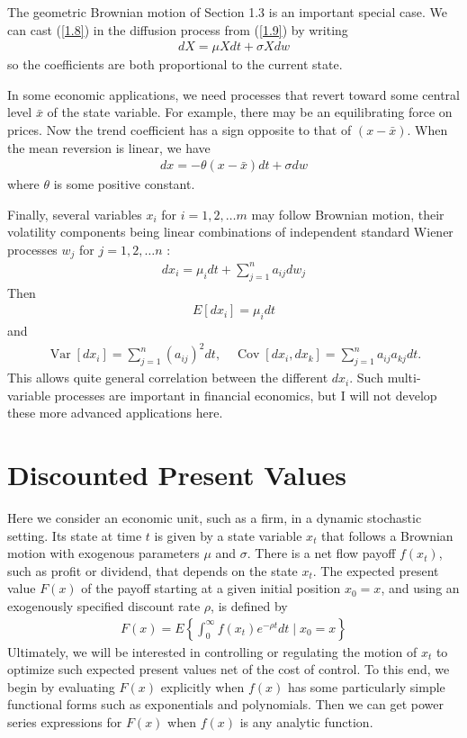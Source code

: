 \documentclass[12pt]{article}
\theoremstyle{definition}
\begin{document}
The geometric Brownian motion of Section 1.3 is an important special case. We can cast (\ref{1.8}) in the diffusion process from (\ref{1.9}) by writing
\begin{align*}
d X=\mu X d t+\sigma X dw
\end{align*}
so the coefficients are both proportional to the current state.

In some economic applications, we need processes that revert toward some central level $\bar{x}$ of the state variable. For example, there may be an equilibrating force on prices. Now the trend coefficient has a sign opposite to that of $(x-\bar{x})$. When the mean reversion is linear, we have
\begin{align}
d x=-\theta(x-\bar{x}) d t+\sigma dw \label{1.10}
\end{align}
where $\theta$ is some positive constant.

Finally, several variables $x_{i}$ for $i=1,2, \ldots m$ may follow Brownian motion, their volatility components being linear combinations of independent standard Wiener processes $w_{j}$ for $j=1,2, \ldots n$ :
\begin{align*}
d x_{i}=\mu_{i} d t+\sum_{j=1}^{n} a_{i j} d w_{j}
\end{align*}
Then
\begin{align*}
E\left[d x_{i}\right]=\mu_{i} dt
\end{align*}
and
\begin{align*}
\operatorname{Var}\left[d x_{i}\right]=\sum_{j=1}^{n}\left(a_{i j}\right)^{2} d t, \quad \operatorname{Cov}\left[d x_{i}, d x_{k}\right]=\sum_{j=1}^{n} a_{i j} a_{k j} dt.
\end{align*}
This allows quite general correlation between the different $d x_{i}$. Such multi-variable processes are important in financial economics, but I will not develop these more advanced applications here.

\section{Discounted Present Values}
Here we consider an economic unit, such as a firm, in a dynamic stochastic setting. Its state at time $t$ is given by a state variable $x_{t}$ that follows a Brownian motion with exogenous parameters $\mu$ and $\sigma$. There is a net flow payoff $f\left(x_{t}\right)$, such as profit or dividend, that depends on the state $x_{t}$. The expected present value $F(x)$ of the payoff starting at a given initial position $x_{0}=x$, and using an exogenously specified discount rate $\rho$, is defined by
\begin{align}
F(x)=E\left\{\int_{0}^{\infty} f\left(x_{t}\right) e^{-\rho t} d t \mid x_{0}=x\right\} \label{2.1}
\end{align}
Ultimately, we will be interested in controlling or regulating the motion of $x_{t}$ to optimize such expected present values net of the cost of control. To this end, we begin by evaluating $F(x)$ explicitly when
$f(x)$ has some particularly simple functional forms such as exponentials and polynomials. Then we can get power series expressions for $F(x)$ when $f(x)$ is any analytic function.
\end{document}
